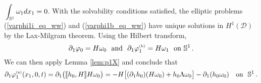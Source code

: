 \documentclass[11pt]{article}
\theoremstyle{plain}
\theoremstyle{definition}
\theoremstyle{definition}
\def\D{{\mathcal D}}
\def\p{\text{\bf\emph{p}}}
\def\p{{\partial\hspace{1pt}}}
\def\comm#1#2{{\llbracket#1,#2\rrbracket}}
\def\smallint#1#2{{\text{\small$\displaystyle{}\int_{#1}^{#2}$}}}
\begin{document}
$
\smallint{\mathbb{S}^1}{}\, \omega_1 dx_1 = 0$.
With the solvability conditions satisfied, the elliptic problems  (\ref{varphi1i_eq_ww}) and (\ref{varphi1b_eq_ww}) have  unique solutions in $H^1(\D)$ by the Lax-Milgram theorem.
Using the Hilbert transform,
\begin{equation} \label{p1_varphi01_ww}
\p_{\!1} \varphi_0 =  H \omega_0  \ \text{ and } \
\p_{\!1} \varphi_1^{\text{\tiny(b)}} = H \omega_1 \text{ \ on } \mathbb{S}^1\,.
\end{equation}
We can then apply Lemma \ref{lem:p1X} and conclude that
\begin{equation}\label{p1phi1i_ww}
\p_{\!1} \varphi_1^{\text{\rm\tiny(a)}}(x_1,0,t) = \p_{\!1} \big(\comm{h_0}{H} H \omega_0\big) = - H\big[(\p_{\!1}h_0)(H \omega_0) + h_0 \Lambda \omega_0 \big] - \p_{\!1} (h_0 \omega_0) \quad\text{on }\ \mathbb{S}^1\,.
\end{equation}
\end{document}
